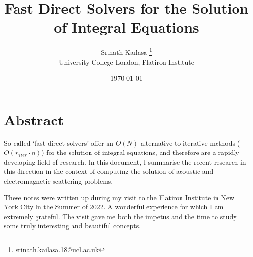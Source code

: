 \documentclass[12pt, a4, twoside]{article}
\title{Fast Direct Solvers for the Solution of Integral Equations}
\author{Srinath Kailasa \thanks{srinath.kailasa.18@ucl.ac.uk} \\ \small University College London, \small Flatiron Institute}
\date{\today}
\begin{document}
\maketitle

\section*{Abstract}
So called `fast direct solvers' offer an $O(N)$ alternative to iterative methods ($O(n_{iter} \cdot n)$) for the solution of integral equations, and therefore are a rapidly developing field of research. In this document, I summarise the recent research in this direction in the context of computing the solution of acoustic and electromagnetic scattering problems.

These notes were written up during my visit to the Flatiron Institute in New York City in the Summer of 2022. A wonderful experience for which I am extremely grateful. The visit gave me both the impetus and the time to study some truly interesting and beautiful concepts.

\tableofcontents
\end{document}
